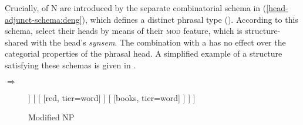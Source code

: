\documentclass[output=paper,colorlinks,citecolor=brown]{langscibook}
\begin{document}
Crucially,  of N are introduced by the separate combinatorial schema in (\ref{head-adjunct-schema:deng}), which defines a distinct phrasal type  (\citealt[56]{Pollard&Sag94a}). According to this schema,  select their heads by means of their \textsc{mod} feature, which is structure-shared with the head's \textit{synsem}. The combination with a  has no effect over the categorial properties of the phrasal head.  
%
A simplified example of a structure satisfying these schemas is given in .

\ea \label{head-adjunct-schema:deng}
 $\Rightarrow$ \\
\z



\begin{figure}
  \centering
\begin{forest}
	[
	\avm{
		[head & \1\\
		spr & <> ] 
	} 
	[
	\avm{
		\2[head & det]	
	} [the, tier=word] ]
	[
	[ [red, tier=word] ] [  [books, tier=word] ]
	]
	]
\end{forest}	
  \caption{Modified NP}
  \label{fig:head-adj:deng}
\end{figure}
\end{document}
